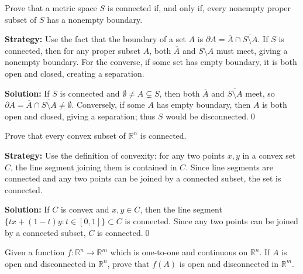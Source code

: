 \begin{problembox}
\begin{problemstatement}
Prove that a metric space $S$ is connected if, and only if, every nonempty proper subset of $S$ has a nonempty boundary.
\end{problemstatement}
\end{problembox}

\noindent\textbf{Strategy:} Use the fact that the boundary of a set $A$ is $\partial A = \overline{A} \cap \overline{S \setminus A}$. If $S$ is connected, then for any proper subset $A$, both $\overline{A}$ and $\overline{S \setminus A}$ must meet, giving a nonempty boundary. For the converse, if some set has empty boundary, it is both open and closed, creating a separation.

\bigskip\noindent\textbf{Solution:}
If $S$ is connected and $\emptyset\ne A\subsetneq S$, then both $\overline{A}$ and $\overline{S\setminus A}$ meet, so $\partial A=\overline{A}\cap\overline{S\setminus A}\ne\emptyset$. Conversely, if some $A$ has empty boundary, then $A$ is both open and closed, giving a separation; thus $S$ would be disconnected.\qed



\begin{problembox}
\begin{problemstatement}
Prove that every convex subset of $\mathbb{R}^n$ is connected.
\end{problemstatement}
\end{problembox}

\noindent\textbf{Strategy:} Use the definition of convexity: for any two points $x, y$ in a convex set $C$, the line segment joining them is contained in $C$. Since line segments are connected and any two points can be joined by a connected subset, the set is connected.

\bigskip\noindent\textbf{Solution:}
If $C$ is convex and $x,y\in C$, then the line segment $\{tx+(1-t)y: t\in[0,1]\}\subset C$ is connected. Since any two points can be joined by a connected subset, $C$ is connected.\qed



\begin{problembox}
\begin{problemstatement}
Given a function $f : \mathbb{R}^n \to \mathbb{R}^m$ which is one-to-one and continuous on $\mathbb{R}^n$. If $A$ is open and disconnected in $\mathbb{R}^n$, prove that $f(A)$ is open and disconnected in $\mathbb{R}^m$.
\end{problemstatement}
\end{problembox}

